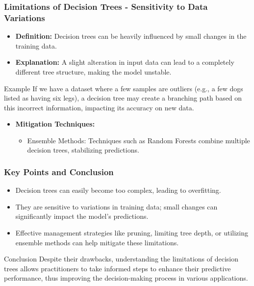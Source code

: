 \documentclass[aspectratio=169]{beamer}
\begin{document}
\begin{frame}[fragile]
  \frametitle{Limitations of Decision Trees - Sensitivity to Data Variations}
  \begin{itemize}
    \item \textbf{Definition:} Decision trees can be heavily influenced by small changes in the training data.
    \item \textbf{Explanation:} A slight alteration in input data can lead to a completely different tree structure, making the model unstable.
  \end{itemize}

  \begin{block}{Example}
    If we have a dataset where a few samples are outliers (e.g., a few dogs listed as having six legs), a decision tree may create a branching path based on this incorrect information, impacting its accuracy on new data.
  \end{block}

  \begin{itemize}
    \item \textbf{Mitigation Techniques:}
      \begin{itemize}
        \item Ensemble Methods: Techniques such as Random Forests combine multiple decision trees, stabilizing predictions.
      \end{itemize}
  \end{itemize}
\end{frame}

\begin{frame}[fragile]
  \frametitle{Key Points and Conclusion}
  \begin{itemize}
    \item Decision trees can easily become too complex, leading to overfitting.
    \item They are sensitive to variations in training data; small changes can significantly impact the model’s predictions.
    \item Effective management strategies like pruning, limiting tree depth, or utilizing ensemble methods can help mitigate these limitations.
  \end{itemize}

  \begin{block}{Conclusion}
    Despite their drawbacks, understanding the limitations of decision trees allows practitioners to take informed steps 
    to enhance their predictive performance, thus improving the decision-making process in various applications.
  \end{block}
\end{frame}
\end{document}
